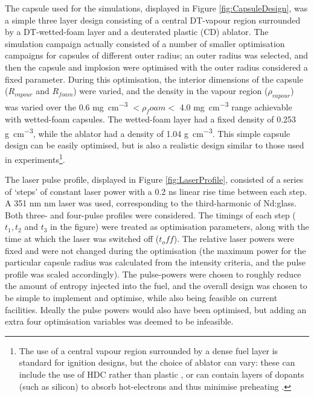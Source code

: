 The capsule used for the simulations, displayed in Figure \ref{fig:CapsuleDesign}, was a simple three layer design consisting of a central DT-vapour region surrounded by a DT-wetted-foam layer and a deuterated plastic (CD) ablator. The simulation campaign actually consisted of a number of smaller optimisation campaigns for capsules of different outer radius; an outer radius was selected, and then the capsule and implosion were optimised with the outer radius considered a fixed parameter. During this optimisation, the interior dimensions of the capsule ($R_{vapour}$ and $R_{foam}$) were varied, and the density in the vapour region ($\rho_{vapour}$) was varied over the 0.6 \unit{\milli\gram\per\centi\meter\cubed} $< \rho_foam <$ 4.0 \unit{\milli\gram\per\centi\meter\cubed} range achievable with wetted-foam capsules. The wetted-foam layer had a fixed density of 0.253 \unit{\gram\per\centi\meter\cubed}, while the ablator had a density of 1.04 \unit{\gram\per\centi\meter\cubed}. This simple capsule design can be easily optimised, but is also a realistic design similar to those used in experiments\footnote{ The use of a central vapour region surrounded by a dense fuel layer is standard for ignition designs, but the choice of ablator can vary: these can include the use of HDC rather than plastic \cite{Mackinnon2014}, or can contain layers of dopants (such as silicon) to absorb hot-electrons and thus minimise preheating \cite{Solodov2022}.}. 

The laser pulse profile, displayed in Figure \ref{fig:LaserProfile}, consisted of a series of `steps' of constant laser power with a 0.2 \unit{\nano\second} linear rise time between each step. A 351 \unit{\nano\meter} nm laser was used, corresponding to the third-harmonic of Nd:glass. Both three- and four-pulse profiles were considered. The timings of each step ($t_1, t_2$ and $t_3$ in the figure) were treated as optimisation parameters, along with the time at which the laser was switched off ($t_off$). The relative laser powers were fixed and were not changed during the optimisation (the maximum power for the particular capsule radius was calculated from the intensity criteria, and the pulse profile was scaled accordingly). The pulse-powers were chosen to roughly reduce the amount of entropy injected into the fuel, and the overall design was chosen to be simple to implement and optimise, while also being feasible on current facilities. Ideally the pulse powers would also have been optimised, but adding an extra four optimisation variables was deemed to be infeasible.

